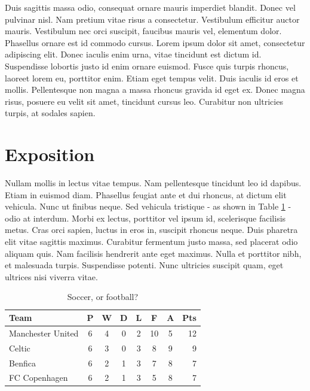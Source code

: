 \documentclass[sigconf]{acmart}
\begin{document}
Duis sagittis massa odio, consequat ornare mauris imperdiet blandit. \cite{levoy:2000:TDM} Donec vel pulvinar nisl. Nam pretium vitae risus a consectetur. \cite{sako:2001:SSB, fedkiw:2001:VSO, Jobs95} Vestibulum efficitur auctor mauris. Vestibulum nec orci suscipit, faucibus mauris vel, elementum dolor. Phasellus ornare est id commodo cursus. Lorem ipsum dolor sit amet, consectetur adipiscing elit. Donec iaculis enim urna, vitae tincidunt est dictum id. Suspendisse lobortis justo id enim ornare euismod. Fusce quis turpis rhoncus, laoreet lorem eu, porttitor enim. \cite{kartch:2000:ERA, yee:2000:SSA, parke:1996:CFA} Etiam eget tempus velit. Duis iaculis id eros et mollis. Pellentesque non magna a massa rhoncus gravida id eget ex. Donec magna risus, posuere eu velit sit amet, tincidunt cursus leo. Curabitur non ultricies turpis, at sodales sapien.

\section{Exposition}

Nullam mollis in lectus vitae tempus. Nam pellentesque tincidunt leo id dapibus. Etiam in euismod diam. \cite{ceres-solver, Asaro:1976:POT} Phasellus feugiat ante et dui rhoncus, at dictum elit vehicula. Nunc ut finibus neque. Sed vehicula tristique - as shown in Table \ref{soccer} - odio at interdum. Morbi ex lectus, porttitor vel ipsum id, scelerisque facilisis metus. Cras orci sapien, luctus in eros in, suscipit rhoncus neque. Duis pharetra elit vitae sagittis maximus. Curabitur fermentum justo massa, sed placerat odio aliquam quis. Nam facilisis hendrerit ante eget maximus. Nulla et porttitor nibh, et malesuada turpis. Suspendisse potenti. Nunc ultricies suscipit quam, eget ultrices nisi viverra vitae.

\begin{table}[ht]
\begin{center}
    \caption{Soccer, or football?}
\label{soccer}
\begin{tabular}{l*{6}{c}r}
Team              & P & W & D & L & F  & A & Pts \\
\hline
Manchester United & 6 & 4 & 0 & 2 & 10 & 5 & 12  \\
Celtic            & 6 & 3 & 0 & 3 &  8 & 9 &  9  \\
Benfica           & 6 & 2 & 1 & 3 &  7 & 8 &  7  \\
FC Copenhagen     & 6 & 2 & 1 & 3 &  5 & 8 &  7  \\
\end{tabular}
\end{center}
\end{table}
\end{document}
